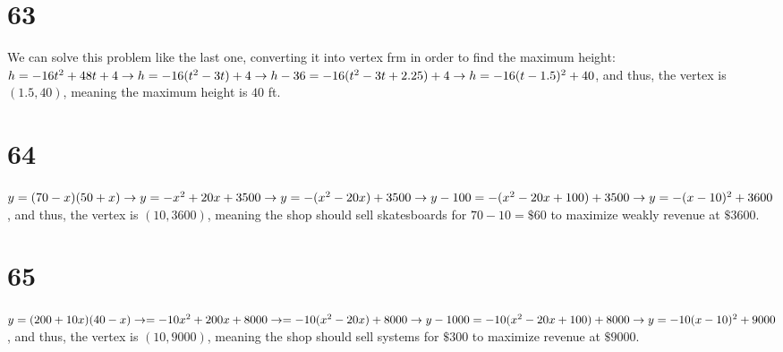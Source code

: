 \documentclass{article}
\theoremstyle{definition}
\begin{document}
\section*{63}
We can solve this problem like the last one, converting it into vertex frm in order to find the maximum height:\newline
$h=-16t^2+48t+4\newline\rightarrow h=-16(t^2-3t)+4\newline\rightarrow h-36=-16(t^2-3t+2.25)+4\newline\rightarrow h=-16(t-1.5)^2+40$, and thus, 
the vertex is $(1.5,40)$, meaning the maximum height is $40$ ft.

\section*{64}
$y=(70-x)(50+x)\newline\rightarrow y=-x^2+20x+3500\newline\rightarrow y=-(x^2-20x)+3500\newline\rightarrow y-100=-(x^2-20x+100)+3500\newline\rightarrow 
y=-(x-10)^2+3600$, and thus, the vertex is $(10,3600)$, meaning the shop should sell 
skatesboards for $70-10=\$60$ to maximize weakly revenue at $\$3600$. 

\section*{65}
$y=(200+10x)(40-x)\newline\rightarrow =-10x^2+200x+8000\newline\rightarrow =-10(x^2-20x)+8000\newline\rightarrow y-1000=-10(x^2-20x+100)+8000\newline
\rightarrow y=-10(x-10)^2+9000$, and thus, the vertex is $(10,9000)$, meaning the shop should sell systems for $\$300$ to maximize revenue at 
$\$9000$.
\end{document}
